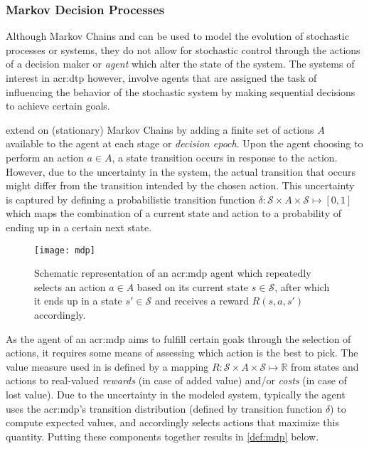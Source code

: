 \subsubsection{Markov Decision Processes}
\label{sec:mdps}


Although Markov Chains and  can be used to model the evolution of stochastic processes or systems, they do not allow for stochastic control through the actions of a decision maker or \textit{agent} which alter the state of the system.
The systems of interest in \acrshort{acr:dtp} however, involve agents that are assigned the task of influencing the behavior of the stochastic system by making sequential decisions to achieve certain goals.

 extend on (stationary) Markov Chains by adding a finite set of actions $A$ available to the agent at each stage or \textit{decision epoch}.
Upon the agent choosing to perform an action $a \in A$, a state transition occurs in response to the action.
However, due to the uncertainty in the system, the actual transition that occurs might differ from the transition intended by the chosen action.
This uncertainty is captured by defining a probabilistic transition function $\delta: \mathcal{S} \times A \times \mathcal{S} \mapsto [0,1]$ which maps the combination of a current state and action to a probability of ending up in a certain next state.

\newpage

\begin{figure}
	\centering
	\texttt{[image: mdp]}
	\caption{Schematic representation of an \acrshort{acr:mdp} agent which repeatedly selects an action $a \in A$ based on its current state $s \in \mathcal{S}$, after which it ends up in a state $s' \in \mathcal{S}$ and receives a reward $R(s, a, s')$ accordingly.}
	\label{fig:mdp}
\end{figure}

As the agent of an \acrshort{acr:mdp} aims to fulfill certain goals through the selection of actions, it requires some means of assessing which action is the best to pick.
The value measure used in  is defined by a mapping $R: \mathcal{S} \times A \times \mathcal{S} \mapsto \mathbb{R}$ from states and actions to real-valued \textit{rewards} (in case of added value) and/or \textit{costs} (in case of lost value).
Due to the uncertainty in the modeled system, typically the agent uses the \acrshort{acr:mdp}'s transition distribution (defined by transition function $\delta$) to compute expected values, and accordingly selects actions that maximize this quantity.
Putting these components together results in \autoref{def:mdp} below.

